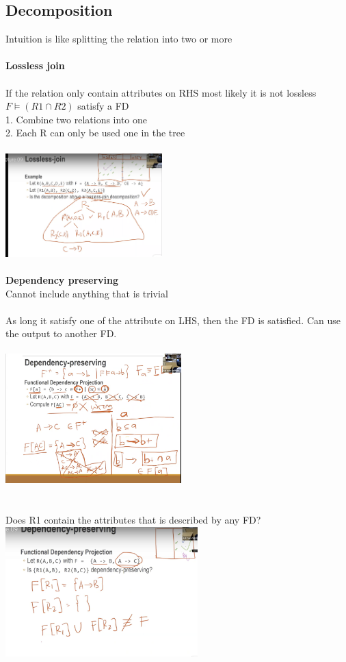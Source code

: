 \documentclass[11pt]{article}
\begin{document}
\subsection*{Decomposition}
Intuition is like splitting the relation into two or more\\\\
\textbf{Lossless join}\\\\
If the relation only contain attributes on RHS most likely it is not lossless
\\
$F \models (R1 \cap R2)$ satisfy a FD\\
1. Combine two relations into one\\
2. Each R can only be used one in the tree\\\\
\includegraphics[height=4cm]{images/s1.png}
\\\\
\textbf{Dependency preserving}\\
Cannot include anything that is trivial\\\\
As long it satisfy one of the attribute on LHS, then the FD is satisfied. Can use the output to another FD.\\\\
\includegraphics[height=5cm]{images/s2.png}
\\\\\\
Does R1 contain the attributes that is described by any FD?\\
\includegraphics[height=5cm]{images/s3.png}
\end{document}
